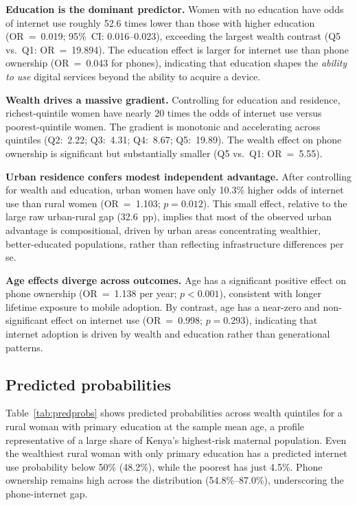 \documentclass[9pt,twoside]{pnas-new}
\begin{document}
\textbf{Education is the dominant predictor.} Women with no education
have odds of internet use roughly 52.6 times lower than those with higher
education (OR~=~0.019; 95\%~CI: 0.016--0.023), exceeding the largest
wealth contrast (Q5 vs.\ Q1: OR~=~19.894). The education effect is
larger for internet use than phone ownership (OR~=~0.043 for phones),
indicating that education shapes the \textit{ability to use} digital
services beyond the ability to acquire a device.

\textbf{Wealth drives a massive gradient.} Controlling for education and
residence, richest-quintile women have nearly 20 times the odds of
internet use versus poorest-quintile women. The gradient is monotonic and
accelerating across quintiles (Q2:~2.22; Q3:~4.31; Q4:~8.67;
Q5:~19.89). The wealth effect on phone ownership is significant but
substantially smaller (Q5 vs.\ Q1: OR~=~5.55).

\textbf{Urban residence confers modest independent advantage.} After
controlling for wealth and education, urban women have only 10.3\% higher
odds of internet use than rural women (OR~=~1.103; $p=0.012$). This
small effect, relative to the large raw urban-rural gap (32.6~pp),
implies that most of the observed urban advantage is compositional,
driven by urban areas concentrating wealthier, better-educated
populations, rather than reflecting infrastructure differences per se.

\textbf{Age effects diverge across outcomes.} Age has a significant
positive effect on phone ownership (OR~=~1.138 per year; $p<0.001$),
consistent with longer lifetime exposure to mobile adoption. By contrast,
age has a near-zero and non-significant effect on internet use
(OR~=~0.998; $p=0.293$), indicating that internet adoption is driven by
wealth and education rather than generational patterns.

\subsection*{Predicted probabilities}

Table~\ref{tab:predprobs} shows predicted probabilities across wealth
quintiles for a rural woman with primary education at the sample mean age,
a profile representative of a large share of Kenya's highest-risk
maternal population. Even the wealthiest rural woman with only primary
education has a predicted internet use probability below 50\% (48.2\%),
while the poorest has just 4.5\%. Phone ownership remains high across
the distribution (54.8\%--87.0\%), underscoring the phone-internet gap.
\end{document}
